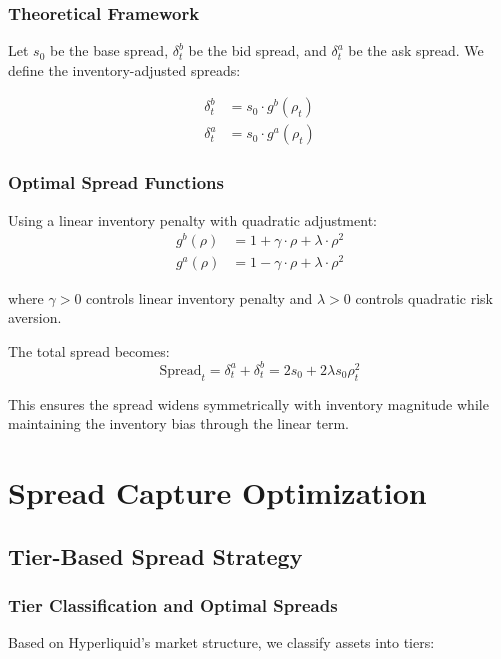 \documentclass[11pt,a4paper]{article}
\theoremstyle{definition}
\begin{document}
\subsubsection{Theoretical Framework}

Let $s_0$ be the base spread, $\delta_t^b$ be the bid spread, and $\delta_t^a$ be the ask spread. We define the inventory-adjusted spreads:

\begin{align}
\delta_t^b &= s_0 \cdot g^b(\rho_t) \\
\delta_t^a &= s_0 \cdot g^a(\rho_t)
\end{align}

\subsubsection{Optimal Spread Functions}

Using a linear inventory penalty with quadratic adjustment:
\begin{align}
g^b(\rho) &= 1 + \gamma \cdot \rho + \lambda \cdot \rho^2 \\
g^a(\rho) &= 1 - \gamma \cdot \rho + \lambda \cdot \rho^2
\end{align}

where $\gamma > 0$ controls linear inventory penalty and $\lambda > 0$ controls quadratic risk aversion.

The total spread becomes:
\begin{equation}
\text{Spread}_t = \delta_t^a + \delta_t^b = 2s_0 + 2\lambda s_0 \rho_t^2
\end{equation}

This ensures the spread widens symmetrically with inventory magnitude while maintaining the inventory bias through the linear term.

\section{Spread Capture Optimization}

\subsection{Tier-Based Spread Strategy}

\subsubsection{Tier Classification and Optimal Spreads}

Based on Hyperliquid's market structure, we classify assets into tiers:
\end{document}
